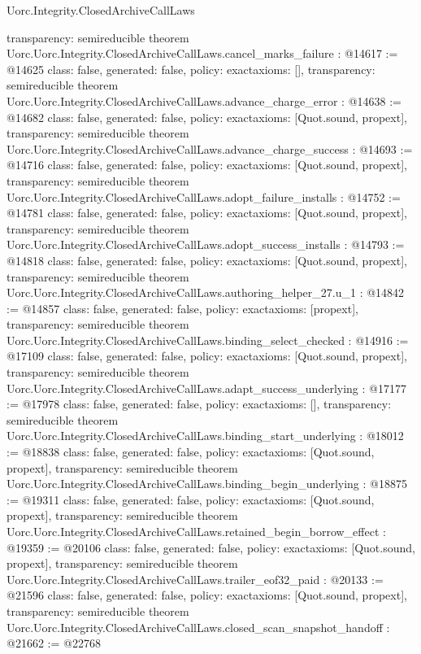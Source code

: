 \begin{lexlean}{Uorc.Integrity.ClosedArchiveCallLaws}
\begin{coremodule}
{  transparency: semireducible
}
theorem Uorc.Uorc.Integrity.ClosedArchiveCallLaws.cancel_marks_failure : @14617 := @14625 {
  class: false,
  generated: false,
  policy: exact{axioms: []},
  transparency: semireducible
}
theorem Uorc.Uorc.Integrity.ClosedArchiveCallLaws.advance_charge_error : @14638 := @14682 {
  class: false,
  generated: false,
  policy: exact{axioms: [Quot.sound, propext]},
  transparency: semireducible
}
theorem Uorc.Uorc.Integrity.ClosedArchiveCallLaws.advance_charge_success : @14693 := @14716 {
  class: false,
  generated: false,
  policy: exact{axioms: [Quot.sound, propext]},
  transparency: semireducible
}
theorem Uorc.Uorc.Integrity.ClosedArchiveCallLaws.adopt_failure_installs : @14752 := @14781 {
  class: false,
  generated: false,
  policy: exact{axioms: [Quot.sound, propext]},
  transparency: semireducible
}
theorem Uorc.Uorc.Integrity.ClosedArchiveCallLaws.adopt_success_installs : @14793 := @14818 {
  class: false,
  generated: false,
  policy: exact{axioms: [Quot.sound, propext]},
  transparency: semireducible
}
theorem Uorc.Uorc.Integrity.ClosedArchiveCallLaws.authoring_helper_27.{u_1} : @14842 := @14857 {
  class: false,
  generated: false,
  policy: exact{axioms: [propext]},
  transparency: semireducible
}
theorem Uorc.Uorc.Integrity.ClosedArchiveCallLaws.binding_select_checked : @14916 := @17109 {
  class: false,
  generated: false,
  policy: exact{axioms: [Quot.sound, propext]},
  transparency: semireducible
}
theorem Uorc.Uorc.Integrity.ClosedArchiveCallLaws.adapt_success_underlying : @17177 := @17978 {
  class: false,
  generated: false,
  policy: exact{axioms: []},
  transparency: semireducible
}
theorem Uorc.Uorc.Integrity.ClosedArchiveCallLaws.binding_start_underlying : @18012 := @18838 {
  class: false,
  generated: false,
  policy: exact{axioms: [Quot.sound, propext]},
  transparency: semireducible
}
theorem Uorc.Uorc.Integrity.ClosedArchiveCallLaws.binding_begin_underlying : @18875 := @19311 {
  class: false,
  generated: false,
  policy: exact{axioms: [Quot.sound, propext]},
  transparency: semireducible
}
theorem Uorc.Uorc.Integrity.ClosedArchiveCallLaws.retained_begin_borrow_effect : @19359 := @20106 {
  class: false,
  generated: false,
  policy: exact{axioms: [Quot.sound, propext]},
  transparency: semireducible
}
theorem Uorc.Uorc.Integrity.ClosedArchiveCallLaws.trailer_eof32_paid : @20133 := @21596 {
  class: false,
  generated: false,
  policy: exact{axioms: [Quot.sound, propext]},
  transparency: semireducible
}
theorem Uorc.Uorc.Integrity.ClosedArchiveCallLaws.closed_scan_snapshot_handoff : @21662 := @22768 {
}
\end{coremodule}
\end{lexlean}
